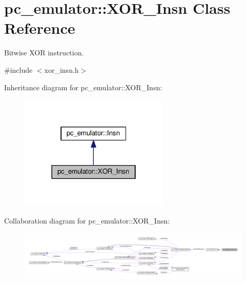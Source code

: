 \hypertarget{classpc__emulator_1_1XOR__Insn}{}\section{pc\+\_\+emulator\+:\+:X\+O\+R\+\_\+\+Insn Class Reference}
\label{classpc__emulator_1_1XOR__Insn}


Bitwise X\+OR instruction.  




{\ttfamily \#include $<$xor\+\_\+insn.\+h$>$}



Inheritance diagram for pc\+\_\+emulator\+:\+:X\+O\+R\+\_\+\+Insn\+:
\nopagebreak
\begin{figure}[H]
\begin{center}
\leavevmode
\includegraphics[width=202pt]{classpc__emulator_1_1XOR__Insn__inherit__graph}
\end{center}
\end{figure}


Collaboration diagram for pc\+\_\+emulator\+:\+:X\+O\+R\+\_\+\+Insn\+:
\nopagebreak
\begin{figure}[H]
\begin{center}
\leavevmode
\includegraphics[width=350pt]{classpc__emulator_1_1XOR__Insn__coll__graph}
\end{center}
\end{figure}
